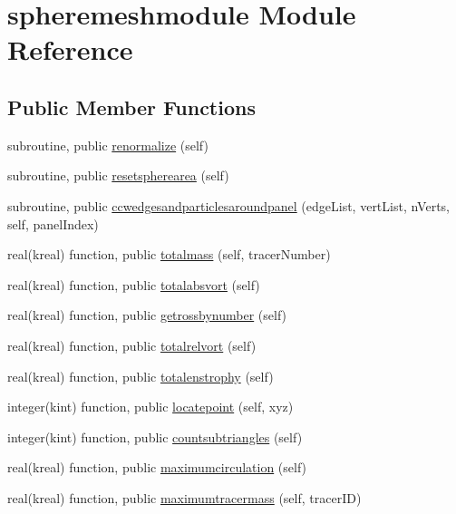 \hypertarget{classspheremeshmodule}{\section{spheremeshmodule Module Reference}
\label{classspheremeshmodule}
}
\subsection*{Public Member Functions}
\begin{DoxyCompactItemize}
\item 
subroutine, public \hyperlink{classspheremeshmodule_a7e822ca8c1c2f3dbb84c1677b73b01d8}{renormalize} (self)
\item 
subroutine, public \hyperlink{classspheremeshmodule_a8a8a47063a070aa34913a6ecffd90e62}{resetspherearea} (self)
\item 
subroutine, public \hyperlink{classspheremeshmodule_a05c2ef27a6cef4f07bacbeae15d7a290}{ccwedgesandparticlesaroundpanel} (edge\+List, vert\+List, n\+Verts, self, panel\+Index)
\item 
real(kreal) function, public \hyperlink{classspheremeshmodule_aff88fd47f20601b9ce1fc3b80f66c180}{totalmass} (self, tracer\+Number)
\item 
real(kreal) function, public \hyperlink{classspheremeshmodule_a73b1f415fd585597ed3d213632cbf8d9}{totalabsvort} (self)
\item 
real(kreal) function, public \hyperlink{classspheremeshmodule_a328b7708b010b001ba36e802abb3c863}{getrossbynumber} (self)
\item 
real(kreal) function, public \hyperlink{classspheremeshmodule_abe01464cd105cc5c2f2d2c577bb3eea2}{totalrelvort} (self)
\item 
real(kreal) function, public \hyperlink{classspheremeshmodule_a3bbd7e4f63fe3cffaff0220681c612d4}{totalenstrophy} (self)
\item 
integer(kint) function, public \hyperlink{classspheremeshmodule_a7d024751a0858a280b313d29f360c973}{locatepoint} (self, xyz)
\item 
integer(kint) function, public \hyperlink{classspheremeshmodule_a7e2d1d284ff59b890c4e2cbe2bc7106c}{countsubtriangles} (self)
\item 
real(kreal) function, public \hyperlink{classspheremeshmodule_a6686ad6af0289f6a4fb2fc33c8aaaec0}{maximumcirculation} (self)
\item 
real(kreal) function, public \hyperlink{classspheremeshmodule_a5e91a046c4930eb535d416ecd186d642}{maximumtracermass} (self, tracer\+I\+D)

\end{DoxyCompactItemize}
